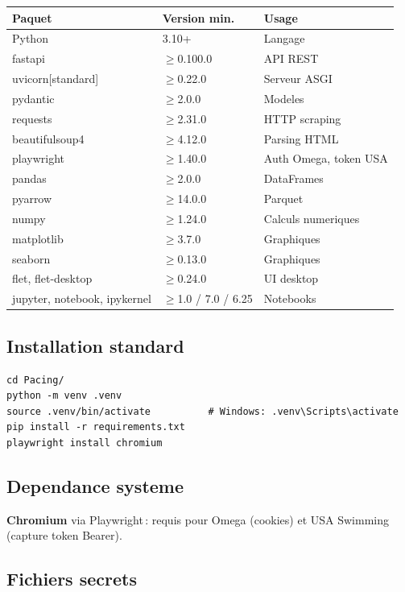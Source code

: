 \documentclass[11pt,a4paper]{article}
\begin{document}
\begin{longtable}{@{}p{}p{}p{}@{}}
\toprule
\textbf{Paquet} & \textbf{Version min.} & \textbf{Usage} \\
\midrule
\endhead
Python & 3.10+ & Langage \\
fastapi & $\geq$0.100.0 & API REST \\
uvicorn[standard] & $\geq$0.22.0 & Serveur ASGI \\
pydantic & $\geq$2.0.0 & Modeles \\
requests & $\geq$2.31.0 & HTTP scraping \\
beautifulsoup4 & $\geq$4.12.0 & Parsing HTML \\
playwright & $\geq$1.40.0 & Auth Omega, token USA \\
pandas & $\geq$2.0.0 & DataFrames \\
pyarrow & $\geq$14.0.0 & Parquet \\
numpy & $\geq$1.24.0 & Calculs numeriques \\
matplotlib & $\geq$3.7.0 & Graphiques \\
seaborn & $\geq$0.13.0 & Graphiques \\
flet, flet-desktop & $\geq$0.24.0 & UI desktop \\
jupyter, notebook, ipykernel & $\geq$1.0 / 7.0 / 6.25 & Notebooks \\
\bottomrule
\end{longtable}

\subsection{Installation standard}

\begin{lstlisting}
cd Pacing/
python -m venv .venv
source .venv/bin/activate          # Windows: .venv\Scripts\activate
pip install -r requirements.txt
playwright install chromium
\end{lstlisting}

\subsection{Dependance systeme}

\textbf{Chromium} via Playwright\,: requis pour Omega (cookies) et USA Swimming (capture token Bearer).

\subsection{Fichiers secrets}
\label{sec:secrets}
\end{document}
